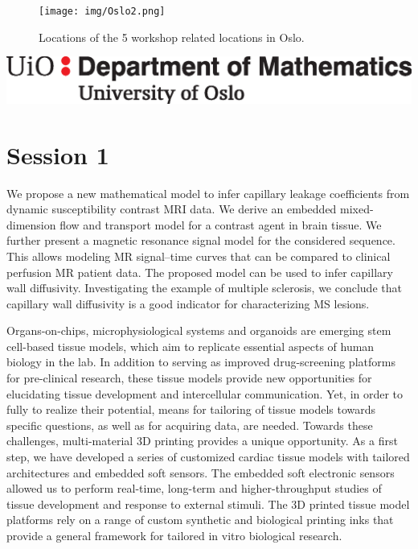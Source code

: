 \documentclass{article}
\begin{document}
\bigskip
\bigskip

\begin{figure}[h]
    \centering
   \texttt{[image: img/Oslo2.png]} 
    \caption{Locations of the 5 workshop related locations in Oslo.}
    \label{fig:Oslo}
\end{figure}




\clearpage



\includegraphics[scale=0.3]{img/mat-mn-navn-eng.eps}


\section*{Session 1}
{We propose a new mathematical model to infer capillary leakage coefficients from dynamic susceptibility contrast MRI data. We derive an embedded mixed-dimension flow and transport model for a contrast agent in brain tissue. We further present a magnetic resonance signal model for the considered sequence. This allows modeling MR signal–time curves that can be compared to clinical perfusion MR patient data. The proposed model can be used to infer capillary wall diffusivity. Investigating the example of multiple sclerosis, we conclude that capillary wall diffusivity is a good indicator for characterizing MS lesions.}



{Organs-on-chips, microphysiological systems and organoids are emerging stem cell-based tissue models, which aim to replicate essential aspects of human biology in the lab. In addition to serving as improved drug-screening platforms for pre-clinical research, these tissue models provide new opportunities for elucidating tissue development and intercellular communication. Yet, in order to fully to realize their potential, means for tailoring of tissue models towards specific questions, as well as for acquiring data, are needed. Towards these challenges, multi-material 3D printing provides a unique opportunity. As a first step, we have developed a series of customized cardiac tissue models with tailored architectures and embedded soft sensors. The embedded soft electronic sensors allowed us to perform real-time, long-term and higher-throughput studies of tissue development and response to external stimuli. The 3D printed tissue model platforms rely on a range of custom synthetic and biological printing inks that provide a general framework for tailored in vitro biological research. }
\end{document}
